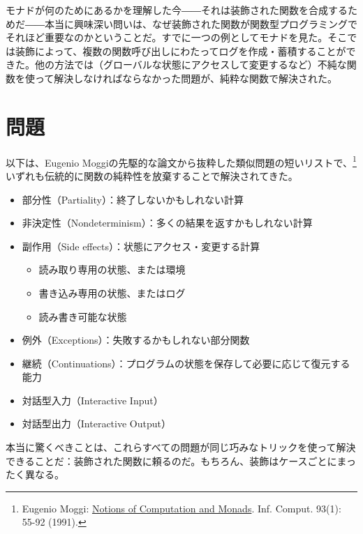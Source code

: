 
\lettrine[lhang=0.17]{モ}{ナドが何のためにあるか}を理解した今――それは装飾された関数を合成するためだ――本当に興味深い問いは、なぜ装飾された関数が関数型プログラミングでそれほど重要なのかということだ。すでに一つの例としてモナドを見た。そこでは装飾によって、複数の関数呼び出しにわたってログを作成・蓄積することができた。他の方法では（グローバルな状態にアクセスして変更するなど）不純な関数を使って解決しなければならなかった問題が、純粋な関数で解決された。

\section{問題}

以下は、Eugenio Moggiの先駆的な論文から抜粋した類似問題の短いリストで、\footnote{Eugenio Moggi:
  \href{https://doi.org/10.1016/0890-5401(91)90052-4}{
    Notions of Computation and Monads}. Inf. Comput. 93(1): 55-92 (1991).}
いずれも伝統的に関数の純粋性を放棄することで解決されてきた。

\begin{itemize}
  \tightlist
  \item
        部分性（Partiality）：終了しないかもしれない計算
  \item
        非決定性（Nondeterminism）：多くの結果を返すかもしれない計算
  \item
        副作用（Side effects）：状態にアクセス・変更する計算

        \begin{itemize}
          \tightlist
          \item
                読み取り専用の状態、または環境
          \item
                書き込み専用の状態、またはログ
          \item
                読み書き可能な状態
        \end{itemize}
  \item
        例外（Exceptions）：失敗するかもしれない部分関数
  \item
        継続（Continuations）：プログラムの状態を保存して必要に応じて復元する能力
  \item
        対話型入力（Interactive Input）
  \item
        対話型出力（Interactive Output）
\end{itemize}

本当に驚くべきことは、これらすべての問題が同じ巧みなトリックを使って解決できることだ：装飾された関数に頼るのだ。もちろん、装飾はケースごとにまったく異なる。

